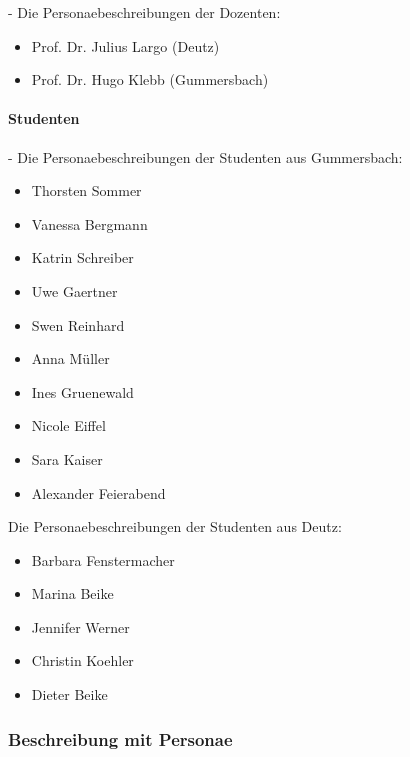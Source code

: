   - Die Personaebeschreibungen der Dozenten:

\begin{itemize}

	\item Prof. Dr. Julius Largo (Deutz)
	\item Prof. Dr. Hugo Klebb (Gummersbach)

\end{itemize}



\paragraph{Studenten} %
\label{par:studenten}

  - Die Personaebeschreibungen der Studenten aus Gummersbach:

\begin{itemize}

	\item   Thorsten Sommer
	\item   Vanessa Bergmann
	\item   Katrin Schreiber
	\item   Uwe Gaertner
	\item   Swen Reinhard
	\item   Anna Müller
	\item   Ines Gruenewald
	\item   Nicole Eiffel
	\item   Sara Kaiser
	\item   Alexander Feierabend

\end{itemize}

Die Personaebeschreibungen der Studenten aus Deutz:

\begin{itemize}

	\item   Barbara Fenstermacher
	\item   Marina Beike
	\item   Jennifer Werner
	\item   Christin Koehler
	\item   Dieter Beike

\end{itemize}



\subsubsection{Beschreibung mit Personae} %
\label{ssub:beschreibung_mit_personae}

